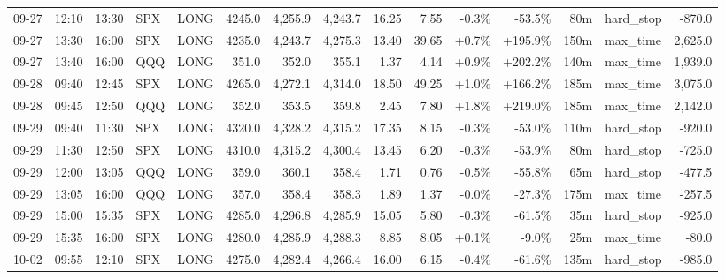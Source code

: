 \documentclass[11pt,a4paper,twoside]{article}
\begin{document}
\begin{landscape}
\begin{center}
\begin{longtable}{>{\color{txtmain}}l l l l l r r r r r r r r >{\color{txtmain}}l r}
09-27 & 12:10 & 13:30 & SPX & LONG & 4245.0 & 4,255.9 & 4,243.7 & 16.25 & 7.55 & \textcolor{lossred}{-0.3\%} & \textcolor{lossred}{-53.5\%} & 80m & hard\_stop & \textcolor{lossred}{-870.0} \\
09-27 & 13:30 & 16:00 & SPX & LONG & 4235.0 & 4,243.7 & 4,275.3 & 13.40 & 39.65 & \textcolor{wingreen}{+0.7\%} & \textcolor{wingreen}{+195.9\%} & 150m & max\_time & \textcolor{wingreen}{2,625.0} \\
09-27 & 13:40 & 16:00 & QQQ & LONG & 351.0 & 352.0 & 355.1 & 1.37 & 4.14 & \textcolor{wingreen}{+0.9\%} & \textcolor{wingreen}{+202.2\%} & 140m & max\_time & \textcolor{wingreen}{1,939.0} \\
09-28 & 09:40 & 12:45 & SPX & LONG & 4265.0 & 4,272.1 & 4,314.0 & 18.50 & 49.25 & \textcolor{wingreen}{+1.0\%} & \textcolor{wingreen}{+166.2\%} & 185m & max\_time & \textcolor{wingreen}{3,075.0} \\
09-28 & 09:45 & 12:50 & QQQ & LONG & 352.0 & 353.5 & 359.8 & 2.45 & 7.80 & \textcolor{wingreen}{+1.8\%} & \textcolor{wingreen}{+219.0\%} & 185m & max\_time & \textcolor{wingreen}{2,142.0} \\
09-29 & 09:40 & 11:30 & SPX & LONG & 4320.0 & 4,328.2 & 4,315.2 & 17.35 & 8.15 & \textcolor{lossred}{-0.3\%} & \textcolor{lossred}{-53.0\%} & 110m & hard\_stop & \textcolor{lossred}{-920.0} \\
09-29 & 11:30 & 12:50 & SPX & LONG & 4310.0 & 4,315.2 & 4,300.4 & 13.45 & 6.20 & \textcolor{lossred}{-0.3\%} & \textcolor{lossred}{-53.9\%} & 80m & hard\_stop & \textcolor{lossred}{-725.0} \\
09-29 & 12:00 & 13:05 & QQQ & LONG & 359.0 & 360.1 & 358.4 & 1.71 & 0.76 & \textcolor{lossred}{-0.5\%} & \textcolor{lossred}{-55.8\%} & 65m & hard\_stop & \textcolor{lossred}{-477.5} \\
09-29 & 13:05 & 16:00 & QQQ & LONG & 357.0 & 358.4 & 358.3 & 1.89 & 1.37 & \textcolor{lossred}{-0.0\%} & \textcolor{lossred}{-27.3\%} & 175m & max\_time & \textcolor{lossred}{-257.5} \\
09-29 & 15:00 & 15:35 & SPX & LONG & 4285.0 & 4,296.8 & 4,285.9 & 15.05 & 5.80 & \textcolor{lossred}{-0.3\%} & \textcolor{lossred}{-61.5\%} & 35m & hard\_stop & \textcolor{lossred}{-925.0} \\
09-29 & 15:35 & 16:00 & SPX & LONG & 4280.0 & 4,285.9 & 4,288.3 & 8.85 & 8.05 & \textcolor{wingreen}{+0.1\%} & \textcolor{lossred}{-9.0\%} & 25m & max\_time & \textcolor{lossred}{-80.0} \\
10-02 & 09:55 & 12:10 & SPX & LONG & 4275.0 & 4,282.4 & 4,266.4 & 16.00 & 6.15 & \textcolor{lossred}{-0.4\%} & \textcolor{lossred}{-61.6\%} & 135m & hard\_stop & \textcolor{lossred}{-985.0} \\

\end{longtable}
\end{center}
\end{landscape}
\end{document}
